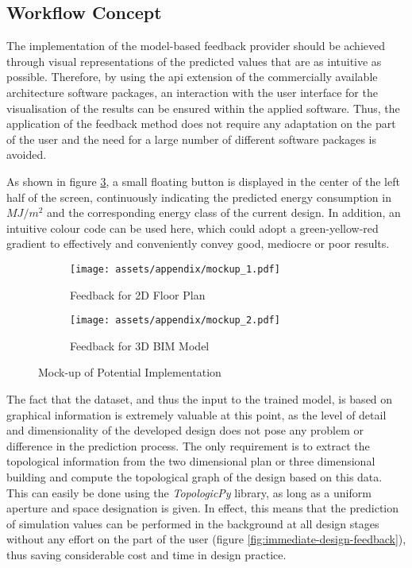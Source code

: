 \documentclass[a4paper, 12pt]{report}
\begin{document}
\subsection{Workflow Concept}\label{subsec:workflow-concept}

The implementation of the model-based feedback provider should be achieved through visual representations of the predicted values that are as intuitive as possible. Therefore, by using the \acrshort{api} extension of the commercially available architecture software packages, an interaction with the user interface for the visualisation of the results can be ensured within the applied software. Thus, the application of the feedback method does not require any adaptation on the part of the user and the need for a large number of different software packages is avoided.

As shown in figure \ref{fig:mock-up-of-potential-implementation}, a small floating button is displayed in the center of the left half of the screen, continuously indicating the predicted energy consumption in $MJ/m^2$ and the corresponding energy class of the current design. In addition, an intuitive colour code can be used here, which could adopt a green-yellow-red gradient to effectively and conveniently convey good, mediocre or poor results.

\begin{figure}
\centering
\begin{subfigure}{\textwidth}
\centering
\texttt{[image: assets/appendix/mockup\_1.pdf]}
\caption{Feedback for 2D Floor Plan}
\label{fig:feedback-for-2d-floor-plan}
\end{subfigure}
\begin{subfigure}{\textwidth}
\centering
\texttt{[image: assets/appendix/mockup\_2.pdf]}
\caption{Feedback for 3D BIM Model}
\label{fig:feedback-for-3d-bim-model}
\end{subfigure}
\caption{Mock-up of Potential Implementation}
\label{fig:mock-up-of-potential-implementation}
\end{figure}

The fact that the dataset, and thus the input to the trained model, is based on graphical information is extremely valuable at this point, as the level of detail and dimensionality of the developed design does not pose any problem or difference in the prediction process. The only requirement is to extract the topological information from the two dimensional plan or three dimensional building and compute the topological graph of the design based on this data. This can easily be done using the \textit{TopologicPy} library, as long as a uniform \gls{aperture} and space designation is given. In effect, this means that the prediction of simulation values can be performed in the background at all design stages without any effort on the part of the user (figure \ref{fig:immediate-design-feedback}), thus saving considerable cost and time in design practice.
\end{document}
